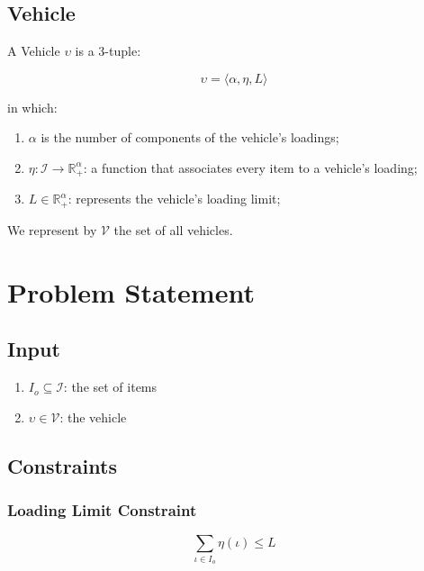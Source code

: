 \documentclass{article}
\newcommand{\nrealnonnegative}[1]{\ensuremath{\mathbb{R}_{+}^{#1}}\xspace}
\newcommand{\tuple}[1]{#1-tuple\xspace}
\newcommand{\OrderedSet}[1]{\ensuremath{\langle#1\rangle}\xspace}
\newcommand{\function}[3]{\ensuremath{#1: #2 \rightarrow #3}\xspace}
\newcommand{\vehicleO}{\ensuremath{\upsilon}\xspace}
\newcommand{\vehicleSet}{\mathcal{V}\xspace}
\newcommand{\loadingFunction}{\ensuremath{\eta}\xspace}
\newcommand{\loadingFunctionApply}[1]{\loadingFunction \left( #1 \right)\xspace}
\newcommand{\loadingLimit}{\ensuremath{L}\xspace}
\newcommand{\nAxles}{\ensuremath{\alpha}\xspace}
\newcommand{\loadingCodomain}{\nrealnonnegative{\nAxles}}
\newcommand{\itemO}{\ensuremath{\iota}\xspace}
\newcommand{\itemSet}{\ensuremath{\mathcal{I}}\xspace}
\newcommand{\itemInput}{\ensuremath{\mathit{I}_{o}}\xspace}
\newcommand{\vehicleInput}{\vehicleO}
\begin{document}
\subsection{Vehicle}

A Vehicle \vehicleO is a \tuple{3}:

\begin{equation}
	\label{def:vehicle}
	\vehicleO = \OrderedSet{
		\nAxles,
		\loadingFunction,
		\loadingLimit
	}
\end{equation}

in which:

\begin{enumerate}
	\item $\nAxles$ is the number of components of the vehicle's loadings;
	\item $\function{\loadingFunction}{\itemSet}{\loadingCodomain}$: a function that associates every item to a vehicle's loading;
	\item $\loadingLimit \in \loadingCodomain$: represents the vehicle's loading limit;
\end{enumerate}

We represent by $\vehicleSet$ the set of all vehicles.

\section{Problem Statement}

\subsection{Input}

\begin{enumerate}
	\item $\itemInput \subseteq \itemSet$: the set of items
	\item $\vehicleInput \in \vehicleSet$: the vehicle
\end{enumerate}

\subsection{Constraints}

\subsubsection*{Loading Limit Constraint}
	\label{constraint:loading-limit}
\begin{equation}
	\displaystyle\sum\limits_{\itemO \in \itemInput}
		\loadingFunctionApply{\itemO}
		\leq \loadingLimit
\end{equation}
\end{document}
